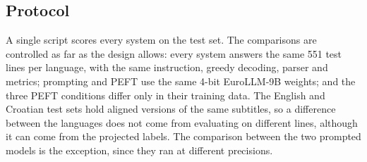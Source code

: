 \subsection{Protocol}
\label{sec:eval_protocol}

A single script scores every system on the test set. The comparisons are controlled as far as the design allows: every system answers the same 551 test lines per language, with the same instruction, greedy decoding, parser and metrics; prompting and PEFT use the same 4-bit EuroLLM-9B weights; and the three PEFT conditions differ only in their training data. The English and Croatian test sets hold aligned versions of the same subtitles, so a difference between the languages does not come from evaluating on different lines, although it can come from the projected labels. The comparison between the two prompted models is the exception, since they ran at different precisions.
